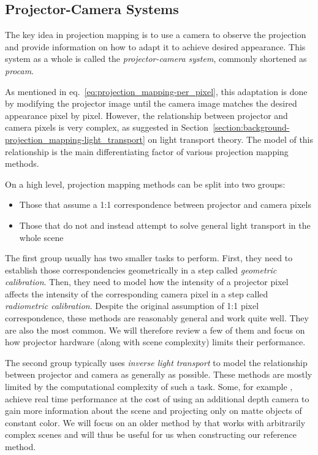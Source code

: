 \subsection{Projector-Camera Systems}
\label{section:background-projection_mapping-procams}

The key idea in projection mapping is to use a camera to observe the projection and provide information on how to adapt it to achieve desired appearance. This system as a whole is called the \textit{projector-camera system}, commonly shortened as \textit{procam}.

As mentioned in eq.~\ref{eq:projection_mapping-per_pixel}, this adaptation is done by modifying the projector image until the camera image matches the desired appearance pixel by pixel. However, the relationship between projector and camera pixels is very complex, as suggested in Section~\ref{section:background-projection_mapping-light_transport} on light transport theory. The model of this relationship is the main differentiating factor of various projection mapping methods.

On a high level, projection mapping methods can be split into two groups:

\begin{itemize}
    \item Those that assume a 1:1 correspondence between projector and camera pixels
    \item Those that do not and instead attempt to solve general light transport in the whole scene
\end{itemize}

The first group usually has two smaller tasks to perform. First, they need to establish those correspondencies geometrically in a step called \textit{geometric calibration}. Then, they need to model how the intensity of a projector pixel affects the intensity of the corresponding camera pixel in a step called \textit{radiometric calibration}. Despite the original assumption of 1:1 pixel correspondence, these methods are reasonably general and work quite well. They are also the most common. We will therefore review a few of them and focus on how projector hardware (along with scene complexity) limits their performance.

The second group typically uses \textit{inverse light transport} to model the relationship between projector and camera as generally as possible. These methods are mostly limited by the computational complexity of such a task. Some, for example \citet{Siegl2017}, achieve real time performance at the cost of using an additional depth camera to gain more information about the scene and projecting only on matte objects of constant color. We will focus on an older method by \citet{Wetzstein2007} that works with arbitrarily complex scenes and will thus be useful for us when constructing our reference method.

